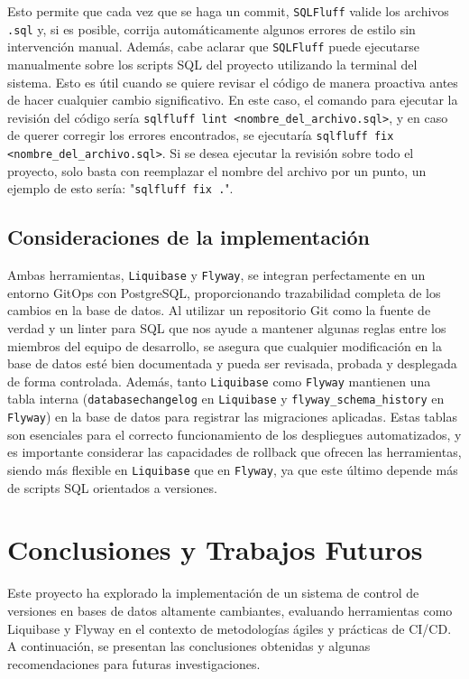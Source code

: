 \documentclass{IEEEtran}
\begin{document}
Esto permite que cada vez que se haga un commit, \texttt{SQLFluff} valide los archivos \texttt{.sql} y, si es posible, corrija automáticamente algunos errores de estilo sin intervención manual. Además, cabe aclarar que \texttt{SQLFluff} puede ejecutarse manualmente sobre los scripts SQL del proyecto utilizando la terminal del sistema. Esto es útil cuando se quiere revisar el código de manera proactiva antes de hacer cualquier cambio significativo. En este caso, el comando para ejecutar la revisión del código sería \texttt{sqlfluff lint <nombre\_del\_archivo.sql>}, y en caso de querer corregir los errores encontrados, se ejecutaría \texttt{sqlfluff fix <nombre\_del\_archivo.sql>}. Si se desea ejecutar la revisión sobre todo el proyecto, solo basta con reemplazar el nombre del archivo por un punto, un ejemplo de esto sería: "\texttt{sqlfluff fix .}".

\subsection{Consideraciones de la implementación}
Ambas herramientas, \texttt{Liquibase} y \texttt{Flyway}, se integran perfectamente en un entorno GitOps con PostgreSQL, proporcionando trazabilidad completa de los cambios en la base de datos. Al utilizar un repositorio Git como la fuente de verdad y un linter para SQL que nos ayude a mantener algunas reglas entre los miembros del equipo de desarrollo, se asegura que cualquier modificación en la base de datos esté bien documentada y pueda ser revisada, probada y desplegada de forma controlada. Además, tanto \texttt{Liquibase} como \texttt{Flyway} mantienen una tabla interna (\texttt{databasechangelog} en \texttt{Liquibase} y \texttt{flyway\_schema\_history} en \texttt{Flyway}) en la base de datos para registrar las migraciones aplicadas. Estas tablas son esenciales para el correcto funcionamiento de los despliegues automatizados, y es importante considerar las capacidades de rollback que ofrecen las herramientas, siendo más flexible en \texttt{Liquibase} que en \texttt{Flyway}, ya que este último depende más de scripts SQL orientados a versiones.


\section{Conclusiones y Trabajos Futuros}
Este proyecto ha explorado la implementación de un sistema de control de versiones en bases de datos altamente cambiantes, evaluando herramientas como Liquibase y Flyway en el contexto de metodologías ágiles y prácticas de CI/CD. A continuación, se presentan las conclusiones obtenidas y algunas recomendaciones para futuras investigaciones.
\end{document}
